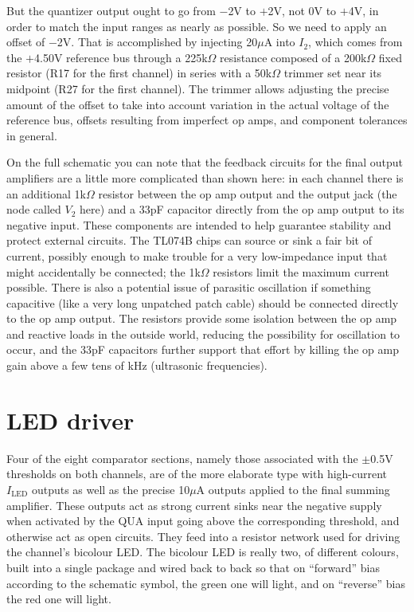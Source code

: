 But the quantizer output ought to go from $-$2V to $+$2V, not 0V to $+$4V,
in order to match the input ranges as nearly as possible.  So we need to
apply an offset of $-$2V.  That is accomplished by injecting 20$\mu$A into
$I_2$, which comes from the $+$4.50V reference bus through a 225k$\Omega$
resistance composed of a 200k$\Omega$ fixed resistor (R17 for the first
channel) in series with a 50k$\Omega$ trimmer set near its midpoint (R27 for
the first channel).  The trimmer allows adjusting the precise amount of the
offset to take into account variation in the actual voltage of the reference
bus, offsets resulting from imperfect op amps, and component tolerances in
general.

On the full schematic you can note that the feedback circuits for the final
output amplifiers are a little more complicated than shown here: in each
channel there is an additional 1k$\Omega$ resistor between the op amp output
and the output jack (the node called $V_2$ here) and a 33pF capacitor
directly from the op amp output to its negative input.  These components are
intended to help guarantee stability and protect external circuits.  The
TL074B chips can source or sink a fair bit of current, possibly enough to
make trouble for a very low-impedance input that might accidentally be
connected; the 1k$\Omega$ resistors limit the maximum current possible. 
There is also a potential issue of parasitic oscillation if something
capacitive (like a very long unpatched patch cable) should be connected
directly to the op amp output.  The resistors provide some isolation between
the op amp and reactive loads in the outside world, reducing the possibility
for oscillation to occur, and the 33pF capacitors further support that
effort by killing the op amp gain above a few tens of kHz (ultrasonic
frequencies).

\section{LED driver}

Four of the eight comparator sections, namely those associated with the
$\pm$0.5V thresholds on both channels, are of the more elaborate type with
high-current $I_\textrm{LED}$ outputs as well as the precise 10$\mu$A
outputs applied to the final summing amplifier.  These outputs act as strong
current sinks near the negative supply when activated by the QUA input going
above the corresponding threshold, and otherwise act as open circuits.  They
feed into a resistor network used for driving the channel's bicolour LED. 
The bicolour LED is really two, of different colours, built into a single
package and wired back to back so that on ``forward'' bias according to the
schematic symbol, the green one will light, and on ``reverse'' bias the red
one will light.

